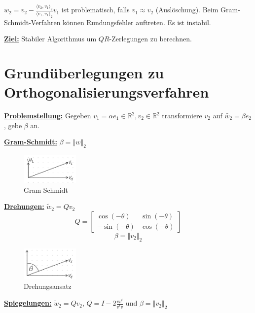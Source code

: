 \documentclass{book}
\def\R{\mathbb{R}}
\begin{document}
            $w_2=v_2-\frac{\langle v_2,v_1 \rangle_2}{\langle v_1,v_1 \rangle_2}v_1$ ist problematisch, falls $v_1\approx v_2$ (Auslöschung).
            Beim Gram-Schmidt-Verfahren können Rundungsfehler auftreten. Es ist instabil.

            \underline{\textbf{Ziel:}} Stabiler Algorithmus um $QR$-Zerlegungen zu berechnen.

        \section{Grundüberlegungen zu Orthogonalisierungsverfahren}

            \underline{\textbf{Problemstellung:}} Gegeben $v_1=\alpha e_1\in\R^2,v_2\in\R^2$ transformiere $v_2$ auf $\tilde{w_2}=\beta e_2$, gebe $\beta$ an.

            \underline{\textbf{Gram-Schmidt:}} $\beta=\left\Vert w \right\Vert_2$

            \begin{figure}[H]
                \centering
                \includegraphics[width=0.25\textwidth]{Bild005}
                \caption{Gram-Schmidt}
            \end{figure}


            \underline{\textbf{Drehungen:}} $\tilde{w}_2= Qv_2$
            \[Q=\begin{bmatrix}
                \cos(-\theta) & \sin(-\theta) \\
                -\sin(-\theta) & \cos(-\theta)
            \end{bmatrix}\]
            \[\beta = \left\Vert v_2 \right\Vert_2\]

            \begin{figure}[H]
                \centering
                \includegraphics[width=0.25\textwidth]{Bild006}
                \caption{Drehungsansatz}
            \end{figure}


            \underline{\textbf{Spiegelungen:}} $\tilde{w}_2=Qv_2$, $Q=I-2\frac{vv^t}{v^tv}$ und $\beta=\left\Vert v_2 \right\Vert_2$
\end{document}
